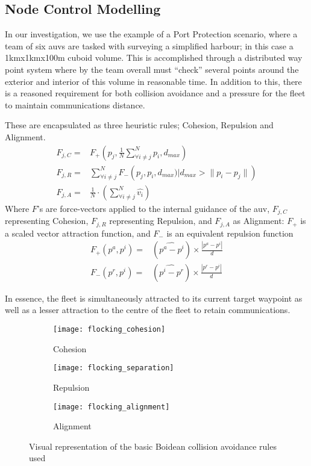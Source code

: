 \subsection{Node Control Modelling}

In our investigation, we use the example of a Port Protection scenario, where a team of six \glspl{auv} are tasked with surveying a simplified harbour; in this case a 1kmx1kmx100m cuboid volume.
This is accomplished through a distributed way point system where by the team overall must ``check'' several points around the exterior and interior of this volume in reasonable time.
In addition to this, there is a reasoned requirement for both collision avoidance and a pressure for the fleet to maintain communications distance.

These are encapsulated as three heuristic rules; Cohesion, Repulsion and Alignment.
\begin{align}
  F_{j,C}=& F_+\left(p_j, \frac{1}{N}\sum\limits_{\forall i \ne j}^N{p_i}, d_{max}\right)\label{eq:fa}\\
  F_{j,R}=& \sum\limits_{\forall i \ne j}^N F_-\left(p_j, p_i, d_{max}) \big| d_{max}>\|p_i-p_j\|\right)\label{eq:fr}\\
  F_{j,A}=& \frac{1}{N}\cdot\left(\sum\limits_{\forall i \ne j}^N \hat{v_i}\right)\label{eq:fc}
\end{align}
Where $F$'s are force-vectors applied to the internal guidance of the \gls{auv}, $F_{j,C}$ representing Cohesion, $F_{j,R}$ representing Repulsion, and $F_{j,A}$ as Alignment: $F_+$ is a scaled vector attraction function, and $F_-$ is an equivalent repulsion function
\begin{align}
  F_+(p^a, p^i)=&(\widehat{p^a-p^i}) \times \frac{|p^a-p^i|}{d}\\
  F_-(p^r, p^i)=&(\widehat{p^i-p^r}) \times \frac{|p^r-p^i|}{d}
\end{align}

In essence, the fleet is simultaneously attracted to its current target waypoint as well as a lesser attraction to the centre of the fleet to retain communications.

\begin{figure*}
  \centering
  \begin{subfigure}[t]{0.3\textwidth}
    \centering
    \texttt{[image: flocking\_cohesion]}
    \caption{Cohesion}
  \end{subfigure}
  \begin{subfigure}[t]{0.3\textwidth}
    \centering
    \texttt{[image: flocking\_separation]}
    \caption{Repulsion}
  \end{subfigure}
  \begin{subfigure}[t]{0.3\textwidth}
    \centering
    \texttt{[image: flocking\_alignment]}
    \caption{Alignment}
  \end{subfigure}
  \caption{Visual representation of the basic Boidean collision avoidance rules used}
  \label{fig:boids}
\end{figure*}


